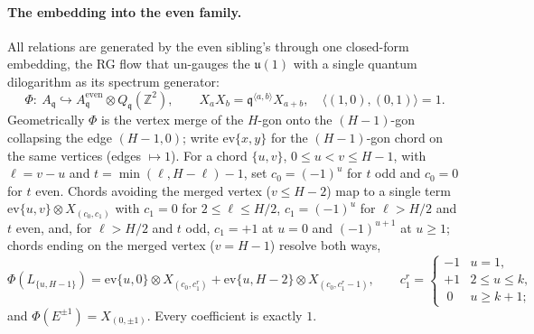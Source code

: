 \documentclass[11pt]{amsart}
\newcommand\fq{\mathfrak{q}}
\newcommand\bZ{\mathbb{Z}}
\theoremstyle{remark}
\begin{document}
\paragraph{The embedding into the even family.}  All relations are
generated by the even sibling's through one closed-form embedding, the
RG flow that un-gauges the $\mathfrak u(1)$ with a single quantum
dilogarithm as its spectrum generator:
\begin{equation}
  \Phi:\ A_\fq\hookrightarrow A^{\mathrm{even}}_\fq\otimes Q_\fq(\bZ^2),
  \qquad X_aX_b=\fq^{\langle a,b\rangle}X_{a+b},\quad\langle(1,0),(0,1)\rangle=1.
\end{equation}
Geometrically $\Phi$ is the vertex merge of the $H$-gon onto the
$(H-1)$-gon collapsing the edge $(H-1,0)$; write $\mathrm{ev}\{x,y\}$ for
the $(H-1)$-gon chord on the same vertices (edges $\mapsto1$).  For a
chord $\{u,v\}$, $0\le u<v\le H-1$, with $\ell=v-u$ and
$t=\min(\ell,H-\ell)-1$, set $c_0=(-1)^u$ for $t$ odd and $c_0=0$ for $t$
even.  Chords avoiding the merged vertex ($v\le H-2$) map to a single
term $\mathrm{ev}\{u,v\}\otimes X_{(c_0,c_1)}$ with $c_1=0$ for
$2\le\ell\le H/2$, $c_1=(-1)^u$ for $\ell>H/2$ and $t$ even, and, for
$\ell>H/2$ and $t$ odd, $c_1=+1$ at $u=0$ and $(-1)^{u+1}$ at $u\ge1$;
chords ending on the merged vertex ($v=H-1$) resolve both ways,
\begin{equation}
  \Phi(L_{\{u,H-1\}})=\mathrm{ev}\{u,0\}\otimes X_{(c_0,c_1^r)}
  +\mathrm{ev}\{u,H-2\}\otimes X_{(c_0,c_1^r-1)},\qquad
  c_1^r=\begin{cases}-1&u=1,\\ +1&2\le u\le k,\\ \ 0&u\ge k+1;\end{cases}
\end{equation}
and $\Phi(E^{\pm1})=X_{(0,\pm1)}$.  Every coefficient is exactly $1$.
\end{document}

